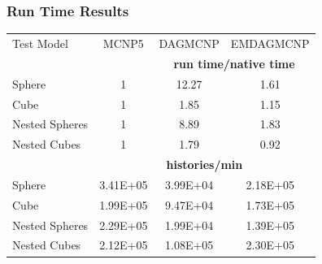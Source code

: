\documentclass[12pt]{beamer}
\begin{document}
\begin{frame}
\frametitle{Run Time Results}

\begin{table}
  \small
  \begin{center}

      \label{timings}
    \begin{tabular}{lccc}


      \toprule
      Test Model & MCNP5 & DAGMCNP & EMDAGMCNP \\
      & \phantom{a} & \multicolumn{2}{c}{\textbf{run time/native time}} \\
      \hline
      Sphere & 1 & 12.27 & 1.61 \\
      Cube & 1 & 1.85 & 1.15 \\
      Nested Spheres & 1 & 8.89 & 1.83 \\
      Nested Cubes & 1 & 1.79 & 0.92 \\
      \hline
      &  \multicolumn{3}{c}{\textbf{histories/min}} \\
      \hline
      Sphere & 3.41E+05  & 3.99E+04  & 2.18E+05   \\
      Cube & 1.99E+05 & 9.47E+04 & 1.73E+05 \\
      Nested Spheres & 2.29E+05 & 1.99E+04 & 1.39E+05 \\
      Nested Cubes & 2.12E+05 & 1.08E+05 & 2.30E+05 \\
      \bottomrule

      
    \end{tabular}
  \end{center}
\end{table}


\end{frame}
\end{document}
